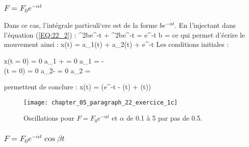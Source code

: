 \subsubsection{$F = F_{0}e^{-\alpha t}$}

Dans ce cas, l'int\'egrale particuli`ere est de la forme $be^{-\alpha t}$. En l'injectant dans l'\'equation (\ref{EQ:22_2}) :
\benn
	\alpha^{2}be^{-\alpha t} + \omega^{2}be^{-\alpha t} = e^{-\alpha t} \Leftrightarrow b = 
\eenn
ce qui permet d'\'ecrire le mouvement ainsi :
\benn
	x(t) = a_{1}\cos(\omega t) + a_{2}\sin(\omega t) + e^{-\alpha t}
\eenn
Les conditions initiales :
\benn
	\begin{cases}
	x(t = 0) = 0 \Leftrightarrow a_{1} +  = 0 \Leftrightarrow a_{1} = - \\
	(t = 0) = 0 \Leftrightarrow a_{2}\omega -  = 0 \Leftrightarrow a_{2} = 
	\end{cases}
\eenn
permettent de conclure :
\benn
	x(t) = \left(e^{-\alpha t} - \cos(\omega t) + \dfrac{\alpha}{\omega}\sin(\omega t)\right)
\eenn

\begin{figure}[htb!]
	\begin{center}
		\texttt{[image: chapter\_05\_paragraph\_22\_exercice\_1c]}
		\caption{Oscillations pour $F = F_{0}e^{-\alpha t}$ et $\alpha$ de 0.1 à 5 par pas de 0.5.}\label{FIG:22_1_c}
	\end{center}
\end{figure}

\subsubsection{$F = F_{0}e^{-\alpha t}\cos\beta t$}

